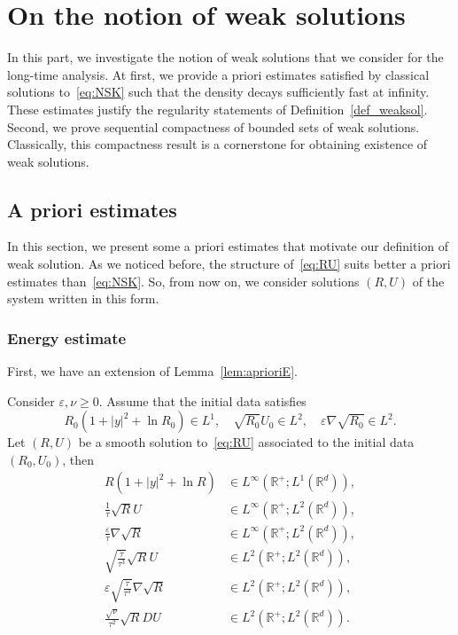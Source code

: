 \documentclass[AHL,Unicode,longabstracts]{cedram}
\newcommand*\R{\mathbb{R}}
\newcommand*\<{\left\langle}
\renewcommand*\>{\right\rangle}
\renewcommand*\ge{\geqslant}
\newcommand*\eps{\varepsilon}
\begin{document}
\section{On the notion of weak solutions}\label{sec:compactness}

In this part, we investigate the notion of weak solutions that we consider for the long-time analysis. At first, we provide a priori estimates satisfied by classical solutions to~\eqref{eq:NSK} such that the density decays sufficiently fast at infinity. These estimates justify the regularity statements of Definition~\ref{def_weaksol}. Second, we prove sequential compactness of bounded sets of weak solutions. Classically, this compactness result is a cornerstone for obtaining existence of weak solutions.

\subsection{A priori estimates}\label{sec:apriori}

In this section, we present some a priori estimates that motivate our definition of weak solution. As we noticed before, the structure of~\eqref{eq:RU} suits better a priori estimates than~\eqref{eq:NSK}. So, from now on, we consider solutions $(R,U)$ of the system written in this form.

\subsubsection{Energy estimate}

First, we have an extension of Lemma~\ref{lem:aprioriE}.

\begin{prop}\label{prop:apriori-energy}
Consider $\eps, \nu \ge 0$. Assume that the initial data satisfies
\[
R_0(1+|y|^2 + \ln R_0) \in L^1, \quad
\sqrt{R_0} U_0 \in L^2, \quad
\eps \nabla \sqrt{R_0} \in L^2.
\]
Let $(R,U)$ be a smooth solution to~\eqref{eq:RU} associated to the initial data $(R_0,U_0)$, then
\begin{equation}\label{eq:apriori-energy}
\begin{aligned}
R(1+|y|^2 + \ln R) &\in L^\infty(\R^+ ; L^1(\R^d)), \\
\frac{1}{\tau} \sqrt{R} U &\in L^\infty(\R^+ ; L^2 (\R^d)), \\
\frac{\eps}{\tau} \nabla \sqrt{R} &\in L^\infty(\R^+ ; L^2 (\R^d)), \\
\sqrt{\frac{\dot \tau}{\tau^3}} \sqrt R U &\in L^2(\R^+ ; L^2 (\R^d)), \\
\eps \sqrt{\frac{\dot \tau}{\tau^3}} \nabla \sqrt{R} &\in L^2(\R^+ ; L^2 (\R^d)), \\
\frac{\sqrt \nu}{\tau^2} \sqrt{R} DU &\in L^2(\R^+ ; L^2 (\R^d)).
\end{aligned}
\end{equation}
\end{prop}
\end{document}
